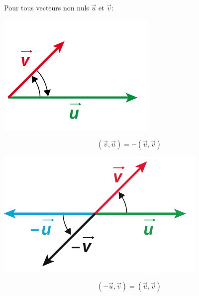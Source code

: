 \documentclass[a4paper,11pt]{article}
\theoremstyle{break}
\begin{document}
\begin{proposition}
 Pour tous vecteurs non nuls $\vec{u}$ et $\vec{v}$:
 \begin{multicols}{2}
  
  
  \begin{center}
    \includegraphics[scale=0.5]{../Images/moinsuv.png}
  \end{center}
  $$(\vec{v},\vec{u})=-(\vec{u},\vec{v})$$
  
  \columnbreak 
  
  
  \begin{center}
    \includegraphics[scale=0.5]{../Images/moinsUetmoinsV.png}
  \end{center}
  $$(-\vec{u},\vec{v})=(\vec{u},\vec{v})$$
  
  \end{multicols}
  

  
\end{proposition}
\end{document}
